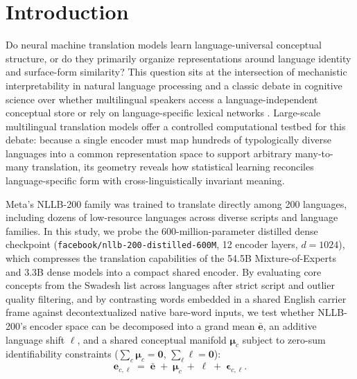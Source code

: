 \section{Introduction}

Do neural machine translation models learn language-universal conceptual structure, or do they primarily organize representations around language identity and surface-form similarity?
This question sits at the intersection of mechanistic interpretability in natural language processing and a classic debate in cognitive science over whether multilingual speakers access a language-independent conceptual store or rely on language-specific lexical networks \citep{kroll1994,dijkstra2002,correia2014,deniz2025}.
Large-scale multilingual translation models offer a controlled computational testbed for this debate: because a single encoder must map hundreds of typologically diverse languages into a common representation space to support arbitrary many-to-many translation, its geometry reveals how statistical learning reconciles language-specific form with cross-linguistically invariant meaning.

Meta's NLLB-200 family \citep{nllbteam2022} was trained to translate directly among 200 languages, including dozens of low-resource languages across diverse scripts and language families.
In this study, we probe the 600-million-parameter distilled dense checkpoint (\texttt{facebook/nllb-200-distilled-600M}, 12 encoder layers, $d = 1024$), which compresses the translation capabilities of the 54.5B Mixture-of-Experts and 3.3B dense models into a compact shared encoder.
By evaluating \NumConcepts{} core concepts from the Swadesh list \citep{swadesh1952} across \NumLanguages{} languages after strict script and outlier quality filtering, and by contrasting words embedded in a shared English carrier frame against decontextualized native bare-word inputs, we test whether NLLB-200's encoder space can be decomposed into a grand mean $\bar{\mathbf{e}}$, an additive language shift $\boldsymbol{\ell}$, and a shared conceptual manifold $\boldsymbol{\mu}_c$ subject to zero-sum identifiability constraints ($\sum_c \boldsymbol{\mu}_c = \mathbf{0}$, $\sum_\ell \boldsymbol{\ell} = \mathbf{0}$):
\begin{equation}
\mathbf{e}_{c,\ell} \;=\; \bar{\mathbf{e}} \;+\; \boldsymbol{\mu}_c \;+\; \boldsymbol{\ell} \;+\; \boldsymbol{\epsilon}_{c,\ell}.
\label{eq:intro-decomposition}
\end{equation}

